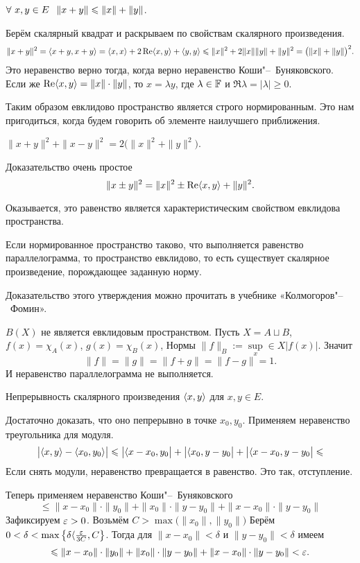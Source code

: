\begin{Ut}
  $\forall\ x,y\in E\pau \|x+y\|\le \|x\| + \|y\|$.
\end{Ut}
\begin{Proof}
  Берём скалярный квадрат и раскрываем по свойствам скалярного произведения.
  \[
    \|x+y\|^2 = \langle x+y,x+y\rangle  = \langle x,x\rangle  + 2\mathop{\text{Re}}\langle x,y\rangle  + \langle y,y\rangle \leqslant \|x\|^2 + 2\|x\|\|y\|+ \|y\|^2 = \big(\|x\|+\|y\|\big)^2.
  \]
Это неравенство верно тогда, когда верно неравенство Коши"--~Буняковского. Если же $\mathop{\text{Re}}\langle x,y\rangle =\|x\|\cdot\|y\|$, то $x = \lambda y$, где $\lambda\in\mathbb F$ и $\Re\lambda =|\lambda|\ge 0$.
\end{Proof}

Таким образом евклидово пространство является строго нормированным. Это нам пригодиться, когда будем говорить об элементе наилучшего приближения.

\begin{Ut}
  $\|x+y\|^2 + \|x-y\|^2 = 2\big(\|x\|^2+\|y\|^2\big)$.
\end{Ut}
\begin{Proof}
  Доказательство очень простое
\[
  \|x\pm y\|^2 = \|x\|^2\pm\mathop{\text{Re}}\langle x,y\rangle  + \|y\|^2.
\]
\end{Proof}
Оказывается, это равенство является характеристическим свойством евклидова пространства.
\begin{Ut}
  Если нормированное пространство таково, что выполняется равенство параллелограмма, то пространство евклидово, то есть существует скалярное произведение, порождающее заданную норму.
\end{Ut}

Доказательство этого утверждения можно прочитать в учебнике «Колмогоров"--~Фомин».

$B(X)$ не является евклидовым пространством. Пусть $X = A\sqcup B$, $f(x) = \chi_A(x)$, $g(x) = \chi_B(x)$, Нормы $\|f\|_B:=\sup\limits_x\in X\big|f(x)\big|$. Значит
\[
  \|f\| = \|g\| = \|f+g\| = \|f-g\|=1.
\]
И неравенство параллелограмма не выполняется.

\begin{Ut}
  Непрерывность скалярного произведения $\langle x,y\rangle $ для $x,y\in E$.
\end{Ut}
\begin{Proof}
  Достаточно доказать, что оно пепрерывно в точке $x_0,y_0$. Применяем неравенство треугольника для модуля.
\[
  \big|\langle x,y\rangle  - \langle x_0,y_0\rangle \big|\leqslant \big|\langle x-x_0,y_0\big|+\big|\langle x_0,y-y_0\big| + \big|\langle x-x_0,y-y_0\big|\leqslant
\]
Если снять модули, неравенство превращается в равенство. Это так, отступление.

Теперь применяем неравенство Коши"--~Буняковского
\[
  \le \|x-x_0\|\cdot\|y_0\| + \|x_0\|\cdot \|y-y_0\| + \|x-x_0\|\cdot \|y-y_0\|
\]
Зафиксируем $\varepsilon> 0$. Возьмём $C> \max\big(\|x_0\|,\|y_0\|\big)$ Берём $0<\delta< \max\left\{\delta\langle \frac{\varepsilon}{3C},C\right\}$. Тогда для $\|x-x_0\|< \delta$ и $\|y-y_0\|< \delta$ имеем
\[
  \leqslant \|x-x_0\|\cdot\|y_0\| + \|x_0\|\cdot \|y-y_0\| + \|x-x_0\|\cdot \|y-y_0\| < \varepsilon.
\]
\end{Proof}


